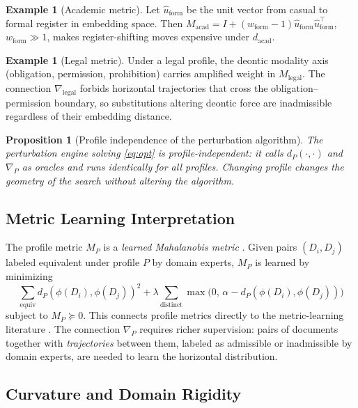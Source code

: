 \documentclass[12pt, a4paper]{article}
\theoremstyle{plain}
\newtheorem{proposition}[theorem]{Proposition}
\theoremstyle{definition}
\newtheorem{example}[theorem]{Example}
\theoremstyle{remark}
\newcommand{\connD}{\nabla}
\begin{document}
\begin{example}[Academic metric]
Let $\hat{u}_{\mathrm{form}}$ be the unit vector from casual to formal register
in embedding space.  Then
$M_{\mathrm{acad}} = I + (w_{\mathrm{form}}-1)\hat{u}_{\mathrm{form}}
\hat{u}_{\mathrm{form}}^\top$, $w_{\mathrm{form}} \gg 1$,
makes register-shifting moves expensive under $d_{\mathrm{acad}}$.
\end{example}

\begin{example}[Legal metric]
Under a legal profile, the deontic modality axis (obligation, permission,
prohibition) carries amplified weight in $M_{\mathrm{legal}}$.  The connection
$\connD_{\mathrm{legal}}$ forbids horizontal trajectories that cross the
obligation--permission boundary, so substitutions altering deontic force are
inadmissible regardless of their embedding distance.
\end{example}

\begin{proposition}[Profile independence of the perturbation algorithm]
\label{prop:profile_independence}
The perturbation engine solving \eqref{eq:opt} is profile-independent: it calls
$d_P(\cdot,\cdot)$ and $\connD_P$ as oracles and runs identically for all
profiles.  Changing profile changes the geometry of the search without altering
the algorithm.
\end{proposition}

\subsection{Metric Learning Interpretation}

The profile metric $M_P$ is a \emph{learned Mahalanobis metric}
\cite{amari2016information}.  Given pairs $(D_i, D_j)$ labeled equivalent
under profile $P$ by domain experts, $M_P$ is learned by minimizing
\[
   \sum_{\text{equiv}} d_P(\phi(D_i),\phi(D_j))^2 +
   \lambda \sum_{\text{distinct}} \max\!\bigl(0,\, \alpha - d_P(\phi(D_i),\phi(D_j))\bigr)
\]
subject to $M_P \succeq 0$.  This connects profile metrics directly to the
metric-learning literature \cite{larsen2016autoencoding}.  The connection
$\connD_P$ requires richer supervision: pairs of documents together with
\emph{trajectories} between them, labeled as admissible or inadmissible by
domain experts, are needed to learn the horizontal distribution.

\subsection{Curvature and Domain Rigidity}
\end{document}
